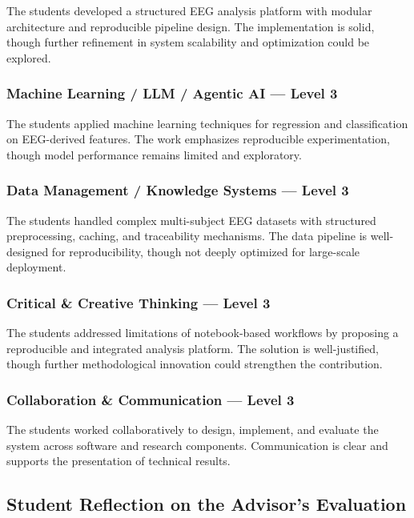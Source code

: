 The students developed a structured EEG analysis platform with modular architecture and
reproducible pipeline design. The implementation is solid, though further refinement in system
scalability and optimization could be explored.

\subsubsection{Machine Learning / LLM / Agentic AI --- Level 3}

The students applied machine learning techniques for regression and classification on
EEG-derived features. The work emphasizes reproducible experimentation, though model
performance remains limited and exploratory.

\subsubsection{Data Management / Knowledge Systems --- Level 3}

The students handled complex multi-subject EEG datasets with structured preprocessing,
caching, and traceability mechanisms. The data pipeline is well-designed for reproducibility,
though not deeply optimized for large-scale deployment.

\subsubsection{Critical \& Creative Thinking --- Level 3}

The students addressed limitations of notebook-based workflows by proposing a reproducible
and integrated analysis platform. The solution is well-justified, though further methodological
innovation could strengthen the contribution.

\subsubsection{Collaboration \& Communication --- Level 3}

The students worked collaboratively to design, implement, and evaluate the system across
software and research components. Communication is clear and supports the presentation of
technical results.

\subsection{Student Reflection on the Advisor's Evaluation}
\label{subsec:reflection-advisor}

